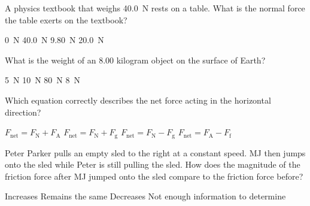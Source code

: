 \documentclass[answers]{exam}
\begin{document}
\begin{questions}

\question 
A physics textbook that weighs \SI{40.0}{N} rests on a table. What is the normal force the table exerts on the textbook?

\begin{randomizeoneparchoices}[norandomize]
    \choice \SI{0}{N}
    \correctchoice \SI{40.0}{N}
    \choice \SI{9.80}{N}
    \choice \SI{20.0}{N}
\end{randomizeoneparchoices}

\question 
What is the weight of an 8.00 kilogram object on the surface of Earth?

\begin{randomizeoneparchoices}[norandomize]
    \choice \SI{5}{N}
    \choice \SI{10}{N}
    \correctchoice \SI{80}{N}
    \choice \SI{8}{N}
\end{randomizeoneparchoices}

\question
Which equation correctly describes the net force acting in the horizontal direction? 

\begin{center}
\end{center}

\begin{randomizechoices}[norandomize]
    \choice $F_\mathrm{net} = F_\mathrm{N} + F_\mathrm{A}$
    \choice $F_\mathrm{net} = F_\mathrm{N} + F_\mathrm{g}$
    \choice $F_\mathrm{net} = F_\mathrm{N} - F_\mathrm{g}$
    \correctchoice $F_\mathrm{net} = F_\mathrm{A} - F_\mathrm{f}$
\end{randomizechoices}

\question 
Peter Parker pulls an empty sled to the right at a constant speed. MJ then jumps onto the sled while Peter is still pulling the sled. How does the magnitude of the friction force after MJ jumped onto the sled compare to the friction force before?

\begin{randomizechoices}[norandomize]
    \correctchoice Increases
    \choice Remains the same
    \choice Decreases
    \choice Not enough information to determine    
\end{randomizechoices}


\end{questions}
\end{document}
